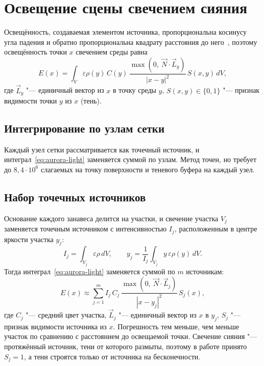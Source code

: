 \section{Освещение сцены свечением сияния}
\label{sec:aurora-lighting}

Освещённость, создаваемая элементом источника, пропорциональна косинусу угла падения и обратно пропорциональна квадрату расстояния до него~\cite[с.~381, 402]{rogers1989}, поэтому освещённость точки $x$ свечением среды равна
\begin{equation}
	E(x) = \int_V \varepsilon \rho(y)\, C(y)\, \frac{\max(0,\ \vec{N} \cdot \vec{L}_y)}{|x - y|^2}\, S(x, y)\, dV,
	\label{eq:aurora-light}
\end{equation}
где $\vec{L}_y$ "--- единичный вектор из $x$ в точку среды $y$, $S(x, y) \in \{0, 1\}$ "--- признак видимости точки $y$ из $x$ (тень).

\subsection{Интегрирование по узлам сетки}

Каждый узел сетки рассматривается как точечный источник, и интеграл~\eqref{eq:aurora-light} заменяется суммой по узлам. Метод точен, но требует до $8{,}4 \cdot 10^6$ слагаемых на точку поверхности и теневого буфера на каждый узел.

\subsection{Набор точечных источников}

Основание каждого занавеса делится на участки, и свечение участка $V_j$ заменяется точечным источником с интенсивностью $I_j$, расположенным в центре яркости участка $y_j$:
\begin{equation}
	I_j = \int_{V_j} \varepsilon \rho\, dV, \qquad y_j = \frac{1}{I_j} \int_{V_j} y\, \varepsilon \rho(y)\, dV.
	\label{eq:point-source}
\end{equation}
Тогда интеграл~\eqref{eq:aurora-light} заменяется суммой по $m$ источникам:
\begin{equation}
	E(x) \approx \sum_{j=1}^{m} I_j\, C_j\, \frac{\max(0,\ \vec{N} \cdot \vec{L}_j)}{|x - y_j|^2}\, S_j(x),
	\label{eq:point-sum}
\end{equation}
где $C_j$ "--- средний цвет участка, $\vec{L}_j$ "--- единичный вектор из $x$ в $y_j$, $S_j$ "--- признак видимости источника из $x$. Погрешность тем меньше, чем меньше участок по сравнению с расстоянием до освещаемой точки. Свечение сияния "--- протяжённый источник, тени от которого размыты, поэтому в работе принято $S_j = 1$, а тени строятся только от источника на бесконечности.

